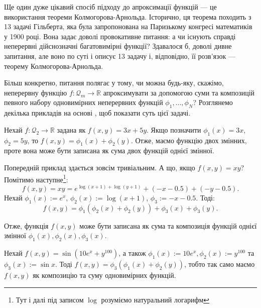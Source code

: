 Ще один дуже цікавий спосіб підходу до апроксимації функцій --- це використання
теореми Колмогорова-Арнольда. Історично, ця теорема походить з 13 задачі
Гільберта, яка була запропонована на Паризькому конгресі математиків у 1900 році.
Вона задає доволі провокативне питання: а чи існують справді неперервні 
дійснозначні багатовимірні функції? Здавалося б, доволі дивне запитання,
але воно по суті і описує 13 задачу і, відповідно, її розв'язок --- теорему
Колмогорова-Арнольда. 

Більш конкретно, питання полягає у тому, чи можна будь-яку, скажімо, неперервну
функцію $f: \mathcal{Q}_m \to \mathbb{R}$ апроксимувати за допомогою суми та
композицій певного набору одновимірних неперервних функцій
$\phi_1,\dots,\phi_N$? Розглянемо декілька прикладів на основі
\cite{ka-explained}, щоб показати суть цієї задачі.

\begin{example}
	Нехай $f: \mathcal{Q}_2 \to \mathbb{R}$ задана як $f(x,y) = 3x+5y$. Якщо
	позначити $\phi_1(x)=3x$, $\phi_2=5y$, то $f(x,y) = \phi_1(x)+\phi_2(y)$.
	Отже, маємо функцію двох змінних, проте вона може бути записана як сума двох
	функцій однієї змінної.
\end{example}

\begin{example}
	Попередній приклад здається зовсім тривіальним. А що, якщо $f(x,y)=xy$? Помітимо 
	наступне\footnote{Тут і далі під записом $\log$ розуміємо натуральний логарифм}:
	\begin{equation*}
		f(x,y) = xy = e^{\log (x+1) + \log(y+1)} + \left(-x-0.5\right) + \left(-y-0.5\right).
	\end{equation*}
	Нехай $\phi_1(x) := e^x$, $\phi_2(x) := \log(x+1)$,
	$\phi_3 := -x-0.5$. Тоді:
	\begin{equation*}
		f(x,y) = \phi_1(\phi_2(x)+\phi_2(y)) + \phi_3(x) + \phi_3(y).
	\end{equation*}

	Отже, функція $f(x,y)$ може бути записана як сума та композиція функцій
	однієї змінної $\phi_1(x),\phi_2(x),\phi_3(x)$.
\end{example}

\begin{example}
	Нехай $f(x,y) = \sin (10e^x + y^{100})$, а також $\phi_1(x) := 10e^x,
	\phi_2(x) := y^{100}$ та $\phi_3(x) := \sin x$. Тоді $f(x,y) =
	\phi_3(\phi_1(x)+\phi_2(y))$, тобто так само маємо $f(x,y)$ як композицію та
	суму одновимірних функцій.
\end{example}

